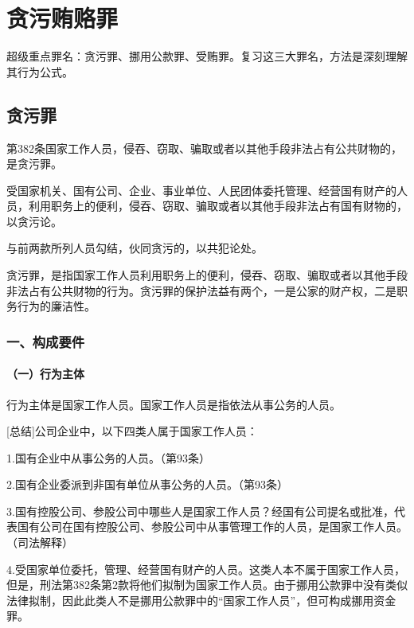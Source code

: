 \chapter{贪污贿赂罪}

\begin{EditionOpeningPanel}
超级重点罪名：贪污罪、挪用公款罪、受贿罪。复习这三大罪名，方法是深刻理解其行为公式。
\end{EditionOpeningPanel}

\section{贪污罪}

第382条国家工作人员，侵吞、窃取、骗取或者以其他手段非法占有公共财物的，是贪污罪。

受国家机关、国有公司、企业、事业单位、人民团体委托管理、经营国有财产的人员，利用职务上的便利，侵吞、窃取、骗取或者以其他手段非法占有国有财物的，以贪污论。

与前两款所列人员勾结，伙同贪污的，以共犯论处。

贪污罪，是指国家工作人员利用职务上的便利，侵吞、窃取、骗取或者以其他手段非法占有公共财物的行为。贪污罪的保护法益有两个，一是公家的财产权，二是职务行为的廉洁性。

\subsection*{一、构成要件}


\subsubsection*{（一）行为主体}

行为主体是国家工作人员。国家工作人员是指依法从事公务的人员。

[总结]公司企业中，以下四类人属于国家工作人员：

1.国有企业中从事公务的人员。（第93条）

2.国有企业委派到非国有单位从事公务的人员。（第93条）

3.国有控股公司、参股公司中哪些人是国家工作人员？经国有公司提名或批准，代表国有公司在国有控股公司、参股公司中从事管理工作的人员，是国家工作人员。（司法解释）

4.受国家单位委托，管理、经营国有财产的人员。这类人本不属于国家工作人员，但是，刑法第382条第2款将他们拟制为国家工作人员。由于挪用公款罪中没有类似法律拟制，因此此类人不是挪用公款罪中的“国家工作人员”，但可构成挪用资金罪。

